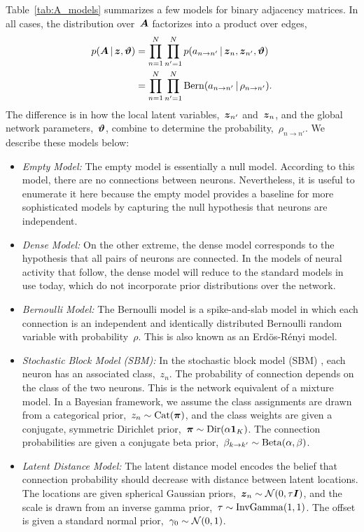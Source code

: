 Table~\ref{tab:A_models} summarizes a few models for binary adjacency
matrices. In all cases, the distribution over~$\boldsymbol{A}$ factorizes into a
product over edges,
\begin{align*}
  p(\boldsymbol{A} \,|\, \boldsymbol{z}, \boldsymbol{\vartheta})
  &= \prod_{n=1}^N \prod_{n'=1}^N p(a_{n \to n'} \,|\, \boldsymbol{z}_n, \boldsymbol{z}_{n'}, \boldsymbol{\vartheta}) \\
  &= \prod_{n=1}^N \prod_{n'=1}^N \mathrm{Bern}(a_{n \to n'} \,|\, \rho_{n \to n'}).
\end{align*}
The difference is in how the local latent variables,~$\boldsymbol{z}_{n'}$
and~$\boldsymbol{z}_n$, and the global network parameters,~$\boldsymbol{\vartheta}$, combine to
determine the probability,~$\rho_{n \to n'}$. We describe these models
below:
\begin{itemize}
\item \textit{Empty Model: } The empty model is essentially a null
  model. According to this model, there are no connections between
  neurons. Nevertheless, it is useful to enumerate it here because
  the empty model provides a baseline for more sophisticated models
  by capturing the null hypothesis that neurons are independent. 
  
\item \textit{Dense Model: } On the other extreme, the dense model
  corresponds to the hypothesis that all pairs of neurons are
  connected. In the models of neural activity that follow, the
  dense model will reduce to the standard models in use today, which
  do not incorporate prior distributions over the network.
  
\item \textit{Bernoulli Model: } The Bernoulli model is a
  spike-and-slab model in which each connection is an independent and
  identically distributed Bernoulli random variable with
  probability~$\rho$. This is also known as an Erd\"os-R\'enyi model.
  
\item \textit{Stochastic Block Model (SBM): } In the stochastic block
  model (SBM) \cite{Nowicki-2001}, each neuron has an associated
  class,~$z_n$.  The probability of connection depends on the class of
  the two neurons.  This is the network equivalent of a mixture model.
  In a Bayesian framework, we assume the class assignments are drawn
  from a categorical prior,~${z_n \sim \mathrm{Cat}(\boldsymbol{\pi})}$, and
  the class weights are given a conjugate, symmetric Dirichlet
  prior,~${\boldsymbol{\pi} \sim \mathrm{Dir}(\alpha \boldsymbol{1}_K)}$. The connection
  probabilities are given a conjugate beta prior,~${\beta_{k \to k'}
    \sim \mathrm{Beta}(\alpha, \beta)}$.
  
\item \textit{Latent Distance Model: } The latent distance model
  \cite{Hoff-2008} encodes the belief that connection probability
  should decrease with distance between latent locations. The
  locations are given spherical Gaussian priors,~$\boldsymbol{z}_n \sim
  \mathcal{N}(0, \tau \boldsymbol{I})$, and the scale is drawn from an inverse
  gamma prior,~$\tau \sim \mathrm{InvGamma}(1,1)$. The offset is given a
  standard normal prior,~$\gamma_0 \sim \mathcal{N}(0, 1)$.

\end{itemize}

